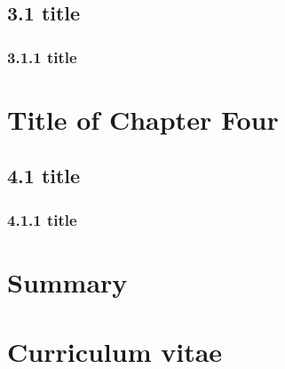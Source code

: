 \documentclass[a4paper,12pt,UTF8,openright]{book}
\begin{document}
\section{3.1 title}
\lipsum[1-5]

\subsection{3.1.1 title}
\lipsum[1-5]

\chapter{Title of Chapter Four}
\lipsum[1-5]

\section{4.1 title}
\lipsum[1-5]

\subsection{4.1.1 title}
\lipsum[1-5]

\chapter{Summary}
\lipsum[1-5]

{}


\chapter*{Curriculum vitae}

	
\end{document}
